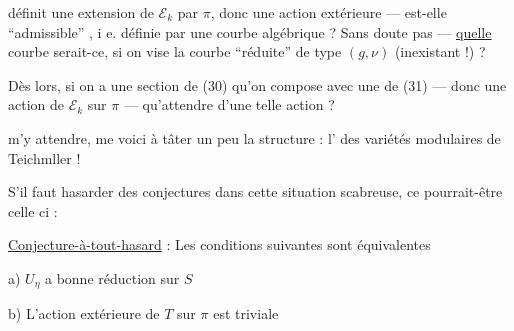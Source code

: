 définit une extension de $\mathcal E_k$ par $\pi$, donc une action extérieure --- est-elle ``admissible'' , i e. définie par une courbe algébrique ? Sans doute pas --- \uline{quelle} courbe serait-ce, si on vise la courbe ``réduite'' de type $(g,\nu)$ (inexistant !) ?

Dès lors, si on a une section de (30) qu'on compose avec une de (31) --- donc une action  de $\mathcal E_k$ sur $\pi$ --- qu'attendre d'une telle action ?

 m'y attendre, me voici à tâter un peu la structure : l' des variétés modulaires de Teichmller !

S'il faut hasarder des conjectures dans cette situation scabreuse, ce pourrait-être celle ci :

\uline{Conjecture-à-tout-hasard} : Les conditions suivantes sont équivalentes

\noindent a) $U_\eta$ a bonne réduction sur $S$

\noindent b) L'action extérieure de $T$ sur $\pi$ est triviale
